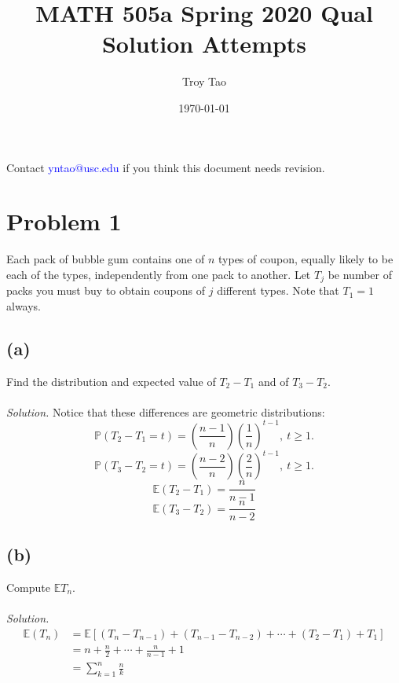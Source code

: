 \documentclass{article}
\title{MATH 505a Spring 2020 Qual Solution Attempts}
\author{Troy Tao}
\date\today
\newcommand{\prob}{\mathbb{P}}
\newcommand{\E}{\mathbb{E}}
\begin{document}
\maketitle 
Contact \textcolor{blue}{yntao@usc.edu} if you think this document needs revision.


\section*{Problem 1}
Each pack of bubble gum contains one of $n$ types of coupon, equally likely to be each of the types, independently from one pack to another. Let $T_j$ be number of packs you must buy to obtain coupons of $j$ different types. Note that $T_1=1$ always.
\subsection*{(a)}
Find the distribution and expected value of $T_2-T_1$ and of $T_3-T_2$.
\color{blue}
\\\\\textit{Solution. }Notice that these differences are geometric distributions:
\begin{equation*}
    \prob(T_2-T_1=t) = \left(\frac{n-1}{n}\right)\left(\frac{1}{n}\right)^{t-1},\ t \geq 1.
\end{equation*}
\begin{equation*}
    \prob(T_3-T_2=t) = \left(\frac{n-2}{n}\right)\left(\frac{2}{n}\right)^{t-1},\ t \geq 1.
\end{equation*}
\begin{equation*}
    \E(T_2-T_1) = \frac{n}{n-1}    
\end{equation*}
\begin{equation*}
    \E(T_3-T_2) = \frac{n}{n-2}
\end{equation*}
\color{black}
\subsection*{(b)}
Compute $\E T_n$.
\color{blue}
\\\\\textit{Solution. }
\begin{equation*}
    \begin{split}
        \E(T_n) &= \E [(T_n-T_{n-1})+(T_{n-1}-T_{n-2})+\cdots+(T_2-T_1)+T_1]\\
            &=n+\frac{n}{2}+\cdots+\frac{n}{n-1}+1\\
            &=\sum_{k=1}^n\frac{n}{k}
    \end{split}
\end{equation*}
\color{black}
\end{document}
